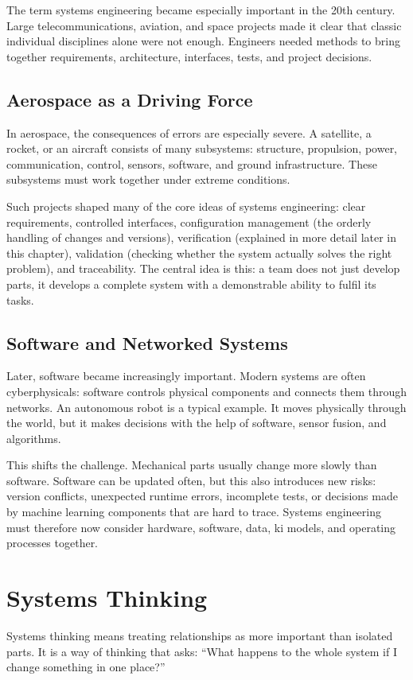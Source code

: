 The term systems engineering became especially important in the 20th century. Large telecommunications, aviation, and space projects made it clear that classic individual disciplines alone were not enough. Engineers needed methods to bring together requirements, architecture, interfaces, tests, and project decisions.

\subsection{Aerospace as a Driving Force}
In aerospace, the consequences of errors are especially severe. A satellite, a rocket, or an aircraft consists of many subsystems: structure, propulsion, power, communication, control, sensors, software, and ground infrastructure. These subsystems must work together under extreme conditions.

Such projects shaped many of the core ideas of systems engineering: clear requirements, controlled interfaces, configuration management (the orderly handling of changes and versions), verification (explained in more detail later in this chapter), validation (checking whether the system actually solves the right problem), and traceability. The central idea is this: a team does not just develop parts, it develops a complete system with a demonstrable ability to fulfil its tasks.

\subsection{Software and Networked Systems}
Later, software became increasingly important. Modern systems are often \glspl{cyberphysical}: software controls physical components and connects them through networks. An autonomous robot is a typical example. It moves physically through the world, but it makes decisions with the help of software, sensor fusion, and algorithms.

This shifts the challenge. Mechanical parts usually change more slowly than software. Software can be updated often, but this also introduces new risks: version conflicts, unexpected runtime errors, incomplete tests, or decisions made by machine learning components that are hard to trace. Systems engineering must therefore now consider hardware, software, data, \gls{ki} models, and operating processes together.

\section{Systems Thinking}
Systems thinking means treating relationships as more important than isolated parts. It is a way of thinking that asks: \enquote{What happens to the whole system if I change something in one place?}

